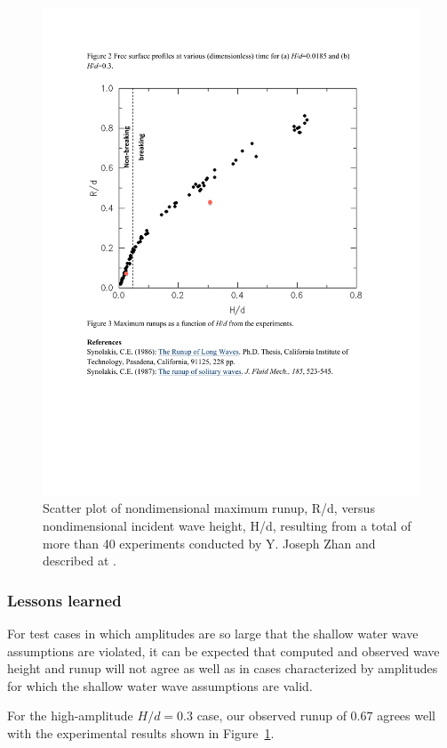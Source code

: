 \begin{figure}[ht]
\hfil\includegraphics[width=5.0in]{bp4/bp4maxrscatter.pdf}\hfil
\caption{\label{bp4maxrscatter} 
Scatter plot of nondimensional maximum runup, R/d, versus nondimensional incident wave height, H/d, resulting from a total of more than 40 experiments conducted by Y. Joseph Zhan and described at \cite{bp-description}.\\
}
\end{figure}

\subsubsection{Lessons learned}

For test cases in which amplitudes are so large that the shallow water wave assumptions are violated, it can be expected that computed and observed wave height and runup will not agree as well as in cases characterized by amplitudes for which the shallow water wave assumptions are valid.

For the high-amplitude $H/d = 0.3$ case, our observed runup of $0.67$
agrees well with the experimental results shown in
Figure~\ref{bp4maxrscatter}.
